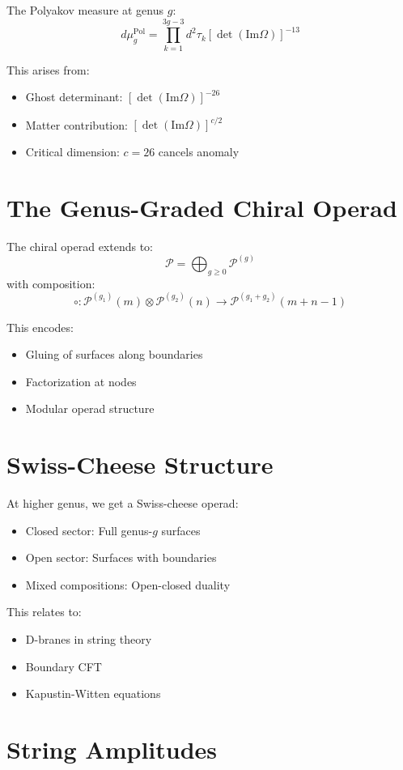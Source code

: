 The Polyakov measure at genus $g$:
$$d\mu_g^{\text{Pol}} = \prod_{k=1}^{3g-3} d^2\tau_k \left[\det(\text{Im}\Omega)\right]^{-13}$$

This arises from:
\begin{itemize}
\item Ghost determinant: $[\det(\text{Im}\Omega)]^{-26}$
\item Matter contribution: $[\det(\text{Im}\Omega)]^{c/2}$
\item Critical dimension: $c = 26$ cancels anomaly
\end{itemize}

\section{The Genus-Graded Chiral Operad}

The chiral operad extends to:
$$\mathcal{P} = \bigoplus_{g \geq 0} \mathcal{P}^{(g)}$$
with composition:
$$\circ: \mathcal{P}^{(g_1)}(m) \otimes \mathcal{P}^{(g_2)}(n) \to \mathcal{P}^{(g_1+g_2)}(m+n-1)$$

This encodes:
\begin{itemize}
\item Gluing of surfaces along boundaries
\item Factorization at nodes
\item Modular operad structure
\end{itemize}

\section{Swiss-Cheese Structure}

At higher genus, we get a Swiss-cheese operad:
\begin{itemize}
\item Closed sector: Full genus-$g$ surfaces
\item Open sector: Surfaces with boundaries
\item Mixed compositions: Open-closed duality
\end{itemize}

This relates to:
\begin{itemize}
\item D-branes in string theory
\item Boundary CFT
\item Kapustin-Witten equations
\end{itemize}

\section{String Amplitudes}

